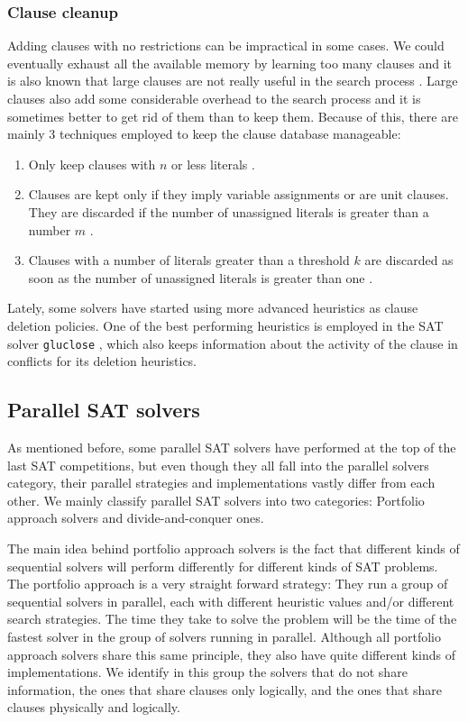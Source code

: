 \documentclass[12pt]{diicc}
\begin{document}
\subsubsection{Clause cleanup}

Adding clauses with no restrictions can be impractical in some cases. We could eventually exhaust all the available memory by learning too many clauses and it is also known that large clauses are not really useful in the search process \cite{grasp}. Large clauses also add some considerable overhead to the search process and it is sometimes better to get rid of them than to keep them. Because of this, there are mainly 3 techniques employed to keep the clause database manageable:

\begin{enumerate}
	\item Only keep clauses with $n$ or less literals \cite{dec90}.
	\item Clauses are kept only if they imply variable assignments or are unit clauses. They are discarded if the number of unassigned literals is greater than a number $m$ \cite{bs97}.
	\item Clauses with a number of literals greater than a threshold $k$ are discarded as soon as the number of unassigned literals is greater than one \cite{grasp}.
\end{enumerate}

Lately, some solvers have started using more advanced heuristics as clause deletion policies. One of the best performing heuristics is employed in the SAT solver \texttt{gluclose} \cite{gluclose}, which also keeps information about the activity of the clause in conflicts for its deletion heuristics.

\subsection{Parallel SAT solvers}

As mentioned before, some parallel SAT solvers have performed at the top of the last SAT competitions, but even though they all fall into the parallel solvers category, their parallel strategies and implementations vastly differ from each other. We mainly classify parallel SAT solvers into two categories: Portfolio approach solvers and divide-and-conquer ones.

The main idea behind portfolio approach solvers is the fact that different kinds of sequential solvers will perform differently for different kinds of SAT problems. The portfolio approach is a very straight forward strategy: They run a group of sequential solvers in parallel, each with different heuristic values and/or different search strategies. The time they take to solve the problem will be the time of the fastest solver in the group of solvers running in parallel. Although all portfolio approach solvers share this same principle, they also have quite different kinds of implementations. We identify in this group the solvers that do not share information, the ones that share clauses only logically, and the ones that share clauses physically and logically.
\end{document}
